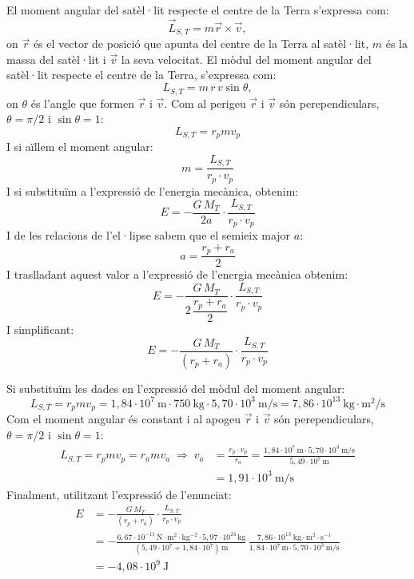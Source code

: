 \begin{solapartat}
El moment angular del satèl·lit respecte el centre de la Terra s'expressa com:
\[ \vec{L}_{S,T} = m\vec{r}\times\vec{v}, \]
on $\vec{r}$ és el vector de posició que apunta del centre de la Terra al satèl·lit, $m$ és la massa del satèl·lit i $\vec{v}$ la seva velocitat. El mòdul del moment angular del satèl·lit respecte el centre de la Terra, s'expressa com:
\[ L_{S,T} = m\,r\,v\sin\theta, \]
on $\theta$ és l'angle que formen $\vec{r}$ i $\vec{v}$. Com al perigeu $\vec{r}$ i $\vec{v}$ són perependiculars, $\theta = \pi/2$ i $\sin\theta = 1$:
\[ L_{S,T} = r_p m v_p \]
I si aïllem el moment angular:
\[ m = \frac{L_{S,T}}{r_p\cdot v_p} \]
I si substituïm a l'expressió de l'energia mecànica, obtenim:
\[ E = -\frac{G\,M_T}{2a}\cdot\frac{L_{S,T}}{r_p\cdot v_p} \]
I de les relacions de l'el·lipse sabem que el semieix major $a$:
\[ a = \frac{r_p + r_a}{2} \]
I traslladant aquest valor a l'expressió de l'energia mecànica obtenim:
\[ E = -\frac{G\,M_T}{2\,\dfrac{r_p + r_a}{2}}\cdot\frac{L_{S,T}}{r_p\cdot v_p} \]
I simplificant:
\[ E = -\frac{G\,M_T}{(r_p + r_a)}\cdot\frac{L_{S,T}}{r_p\cdot v_p} \]
\end{solapartat}

\begin{solapartat}
Si substituïm les dades en l'expressió del mòdul del moment angular:
\[ L_{S,T} = r_p m v_p = 1,84\cdot 10^{7}\ \mathrm{m}\cdot 750\ \mathrm{kg}\cdot 5,70\cdot 10^{3}\ \mathrm{m/s} = 7,86\cdot 10^{13}\ \mathrm{kg\cdot m^2/s} \]
Com el moment angular és constant i al apogeu $\vec{r}$ i $\vec{v}$ són perependiculars, $\theta = \pi/2$ i $\sin\theta = 1$:
\begin{align*}
L_{S,T} = r_p m v_p = r_a m v_a \;\Longrightarrow\; v_a &= \frac{r_p\cdot v_p}{r_a} = \frac{1,84\cdot 10^{7}\ \mathrm{m}\cdot 5,70\cdot 10^{3}\ \mathrm{m/s}}{5,49\cdot 10^{7}\ \mathrm{m}}\\
&= 1,91\cdot 10^{3}\ \mathrm{m/s}
\end{align*}
Finalment, utilitzant l'expressió de l'enunciat:
\begin{align*}
E &= -\frac{G\,M_T}{(r_p + r_a)}\cdot\frac{L_{S,T}}{r_p\cdot v_p}\\
&= -\frac{6,67\cdot 10^{-11}\,\mathrm{N\cdot m^2\cdot kg^{-2}}\cdot 5,97\cdot 10^{24}\,\mathrm{kg}}{(5,49\cdot 10^{7} + 1,84\cdot 10^{7})\,\mathrm{m}}\,\frac{7,86\cdot 10^{13}\ \mathrm{kg\cdot m^2\cdot s^{-1}}}{1,84\cdot 10^{7}\,\mathrm{m}\cdot 5,70\cdot 10^{3}\ \mathrm{m/s}}\\
&= -4,08\cdot 10^{9}\ \mathrm{J}
\end{align*}
\end{solapartat}
